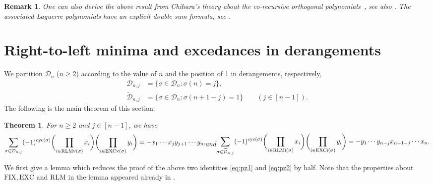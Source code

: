 \documentclass[12pt,reqno]{amsart}
\numberwithin{equation}{section}
\newcommand\cyc{\mathop{ \rm cyc}}
\newcounter{num}
\def\D{\mathcal{D}}
\def\cyc{\mathop{\rm cyc}}
\newtheorem{thm}{Theorem}
\newtheorem{rem}{Remark}
\begin{document}
\begin{rem}
One can also derive the above result from 
Chihara's theory  about the co-recursive  orthogonal polynomials~\cite{Ch57}, see also \cite{SS96}.
 The associated Laguerre polynomials have an explicit double sum formula, see \cite{KS15}.
\end{rem}

\section{Right-to-left minima and excedances in derangements}\label{type A}
We partition
$\D_n$ ($n\ge2$) according to the value of 
$n$ and the position of 1 in derangements, respectively, 
\begin{subequations}
\begin{align}
 \D_{n,j}&=\{\sigma\in \D_n: \sigma(n)=j\},\\
 \widetilde{\D}_{n,j}&=\{\sigma\in \D_n: \sigma(n+1-j)=1\}\qquad  (j\in [n-1]).
\end{align}
\end{subequations}
The following is the main theorem of  this section.
\begin{thm}\label{thm:pz}
For $n\ge2$ and $j\in [n-1]$, we have 
\begin{subequations}
\begin{align}\label{eq:pz1}
	\sum_{\sigma\in \D_{n,j}}(-1)^{\cyc (\sigma)}
	\biggl( \prod_{i\in \mathrm{RLMv}(\sigma)}x_i \biggr) 
	\biggl( \prod_{i\in \mathrm{EXCv}(\sigma)}y_i \biggr)  =-x_1\cdots x_j y_{j+1}\cdots y_n,
\end{align}
and
\begin{align}\label{eq:pz2}
	\sum_{\sigma\in \widetilde{\D}_{n,j}}(-1)^{\cyc (\sigma)}
	\biggl( \prod_{i\in \mathrm{RLMi}(\sigma)}x_i \biggr) 
	\biggl( \prod_{i\in \mathrm{EXCi}(\sigma)}y_i \biggr)  
	=- y_{1}\cdots y_{n-j}x_{n+1-j}\cdots x_n.
\end{align}
\end{subequations}
\end{thm}

We first give a  lemma which  reduces the proof of 
the above two identities \eqref{eq:pz1}
and \eqref{eq:pz2} by half. 
Note that the properties about $\mathrm{FIX}, \mathrm{EXC}$ and  $\mathrm{RLM}$ in the lemma appeared already  in  \cite[Lemma 21]{AG21}. 
\end{document}
